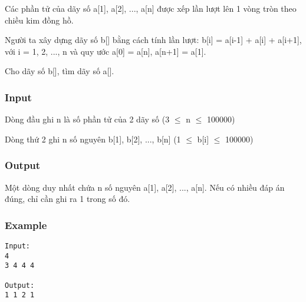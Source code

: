 



   Các phần tử của dãy số a[1], a[2], ..., a[n] được xếp lần lượt lên 1 vòng tròn theo chiều kim đồng hồ.  

   Người ta xây dựng dãy số b[] bằng cách tính lần lượt: b[i] = a[i-1] + a[i] + a[i+1], với i = 1, 2, ..., n và quy ước a[0] = a[n], a[n+1] = a[1].  

   Cho dãy số b[], tìm dãy số a[].  

\subsubsection{   Input  }

   Dòng đầu ghi n là số phần tử của 2 dãy số (3  $\le$  n  $\le$  100000)  

   Dòng thứ 2 ghi n số nguyên b[1], b[2], ..., b[n] (1  $\le$  b[i]  $\le$  100000)  

\subsubsection{   Output  }

   Một dòng duy nhất chứa n số nguyên a[1], a[2], ..., a[n]. Nếu có nhiều đáp án đúng, chỉ cần ghi ra 1 trong số đó.  

\subsubsection{   Example  }
\begin{verbatim}
Input:
4
3 4 4 4

Output:
1 1 2 1
\end{verbatim}
